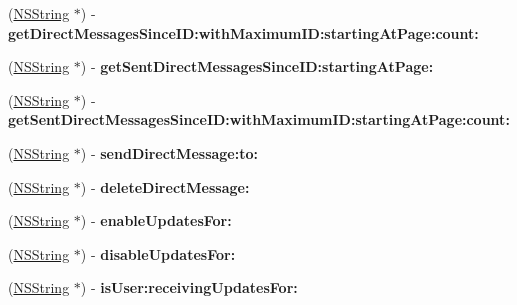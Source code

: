 \begin{DoxyCompactItemize}
\item 
\hypertarget{interface_m_g_twitter_engine_ad140175bf45e9d41001edf80390e850f}{
(\hyperlink{class_n_s_string}{\-N\-S\-String} $\ast$) -\/ {\bfseries get\-Direct\-Messages\-Since\-I\-D\-:with\-Maximum\-I\-D\-:starting\-At\-Page\-:count\-:}}
\label{interface_m_g_twitter_engine_ad140175bf45e9d41001edf80390e850f}

\item 
\hypertarget{interface_m_g_twitter_engine_a2673daf8b082b440ceb04e2044dc5963}{
(\hyperlink{class_n_s_string}{\-N\-S\-String} $\ast$) -\/ {\bfseries get\-Sent\-Direct\-Messages\-Since\-I\-D\-:starting\-At\-Page\-:}}
\label{interface_m_g_twitter_engine_a2673daf8b082b440ceb04e2044dc5963}

\item 
\hypertarget{interface_m_g_twitter_engine_ae16fe04b969e44769d2939f682f94eae}{
(\hyperlink{class_n_s_string}{\-N\-S\-String} $\ast$) -\/ {\bfseries get\-Sent\-Direct\-Messages\-Since\-I\-D\-:with\-Maximum\-I\-D\-:starting\-At\-Page\-:count\-:}}
\label{interface_m_g_twitter_engine_ae16fe04b969e44769d2939f682f94eae}

\item 
\hypertarget{interface_m_g_twitter_engine_a186e34a3636693d8b2a1dfd4a83bcd16}{
(\hyperlink{class_n_s_string}{\-N\-S\-String} $\ast$) -\/ {\bfseries send\-Direct\-Message\-:to\-:}}
\label{interface_m_g_twitter_engine_a186e34a3636693d8b2a1dfd4a83bcd16}

\item 
\hypertarget{interface_m_g_twitter_engine_addaacdd1ca2dd3fadb581bd56e9a80ea}{
(\hyperlink{class_n_s_string}{\-N\-S\-String} $\ast$) -\/ {\bfseries delete\-Direct\-Message\-:}}
\label{interface_m_g_twitter_engine_addaacdd1ca2dd3fadb581bd56e9a80ea}

\item 
\hypertarget{interface_m_g_twitter_engine_a1624a69c9bd1dcd22f57aa3e6ee0fac0}{
(\hyperlink{class_n_s_string}{\-N\-S\-String} $\ast$) -\/ {\bfseries enable\-Updates\-For\-:}}
\label{interface_m_g_twitter_engine_a1624a69c9bd1dcd22f57aa3e6ee0fac0}

\item 
\hypertarget{interface_m_g_twitter_engine_a5524857888e13e7efd9f71fc0a7e31cc}{
(\hyperlink{class_n_s_string}{\-N\-S\-String} $\ast$) -\/ {\bfseries disable\-Updates\-For\-:}}
\label{interface_m_g_twitter_engine_a5524857888e13e7efd9f71fc0a7e31cc}

\item 
\hypertarget{interface_m_g_twitter_engine_a14bc9ae997631519263d6faac1f7f24b}{
(\hyperlink{class_n_s_string}{\-N\-S\-String} $\ast$) -\/ {\bfseries is\-User\-:receiving\-Updates\-For\-:}}
\label{interface_m_g_twitter_engine_a14bc9ae997631519263d6faac1f7f24b}


\end{DoxyCompactItemize}
